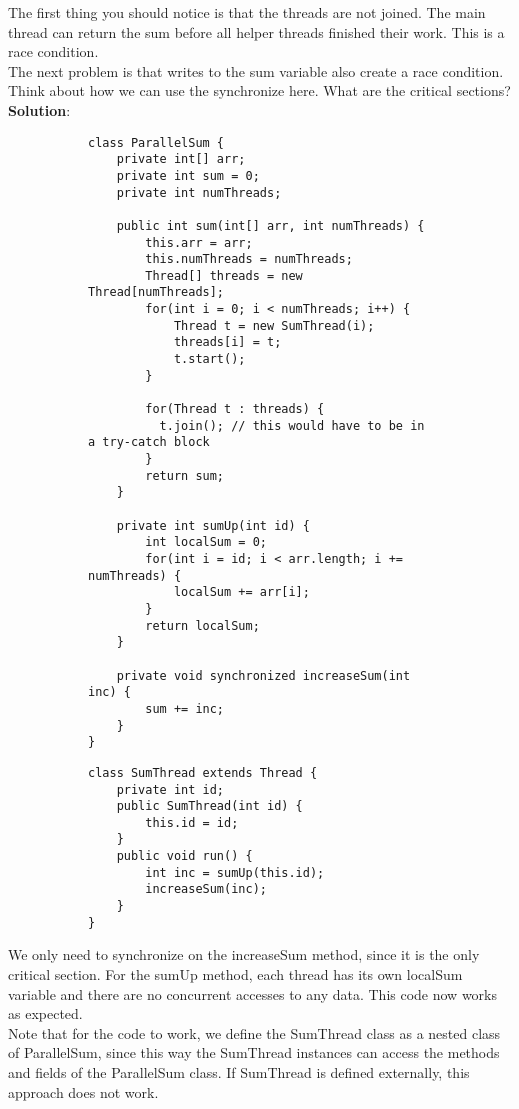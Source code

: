 \documentclass[main.tex]{subfiles}
\begin{document}
The first thing you should notice is that the threads are not joined. The main thread can return the sum before all helper threads finished their work. This is a race condition.\\[3mm]
The next problem is that writes to the sum variable also create a race condition. Think about how we can use the synchronize here. What are the critical sections?\\[3mm]
\textbf{Solution}:
\begin{figure}[H]
    \begin{subfigure}[t]{.62\textwidth}
        \begin{verbatim}
class ParallelSum {
    private int[] arr;
    private int sum = 0;
    private int numThreads;

    public int sum(int[] arr, int numThreads) {
        this.arr = arr;
        this.numThreads = numThreads;
        Thread[] threads = new Thread[numThreads];
        for(int i = 0; i < numThreads; i++) {
            Thread t = new SumThread(i);
            threads[i] = t;
            t.start();
        }

        for(Thread t : threads) {
          t.join(); // this would have to be in a try-catch block
        }
        return sum;
    }

    private int sumUp(int id) {
        int localSum = 0;
        for(int i = id; i < arr.length; i += numThreads) {
            localSum += arr[i];
        }
        return localSum;
    }

    private void synchronized increaseSum(int inc) {
        sum += inc;
    }
}
        \end{verbatim}
    \end{subfigure}%
    \begin{subfigure}[t]{.62\textwidth}
        \begin{verbatim}
class SumThread extends Thread {
    private int id;
    public SumThread(int id) {
        this.id = id;
    }
    public void run() {
        int inc = sumUp(this.id);
        increaseSum(inc);
    }
}
        \end{verbatim}
    \end{subfigure}
\end{figure}
We only need to synchronize on the increaseSum method, since it is the only critical section. For the sumUp method, each thread has its own localSum variable and there are no concurrent accesses to any data. This code now works as expected.\\
Note that for the code to work, we define the SumThread class as a nested class of ParallelSum, since this way the SumThread instances can access the methods and fields of the ParallelSum class. If SumThread is defined externally, this approach does not work.
\end{document}
